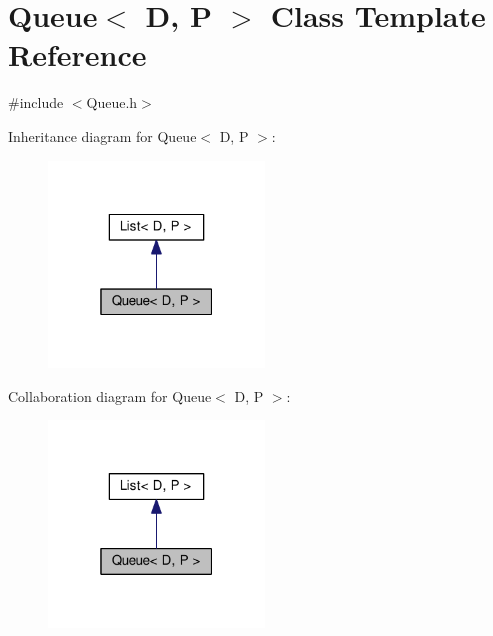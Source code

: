 \hypertarget{classQueue}{}\section{Queue$<$ D, P $>$ Class Template Reference}
\label{classQueue}


{\ttfamily \#include $<$Queue.\+h$>$}



Inheritance diagram for Queue$<$ D, P $>$\+:
\nopagebreak
\begin{figure}[H]
\begin{center}
\leavevmode
\includegraphics[width=163pt]{classQueue__inherit__graph}
\end{center}
\end{figure}


Collaboration diagram for Queue$<$ D, P $>$\+:
\nopagebreak
\begin{figure}[H]
\begin{center}
\leavevmode
\includegraphics[width=163pt]{classQueue__coll__graph}
\end{center}
\end{figure}
